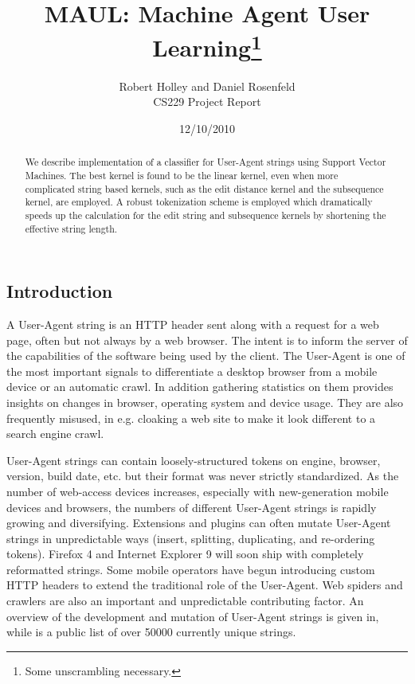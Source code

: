 \documentclass[10pt]{article}
\title{MAUL: Machine Agent User Learning\footnote{Some unscrambling necessary.} }
\author{Robert Holley and Daniel Rosenfeld \\ CS229 Project Report}
\date{12/10/2010}
\begin{document}
\maketitle
\begin{abstract}
We describe implementation of a classifier for User-Agent strings using Support Vector Machines.  The best kernel is found to be the linear kernel, even when more complicated string based kernels, such as the edit distance kernel and the subsequence kernel, are employed.  A robust tokenization scheme is employed which dramatically speeds up the calculation for the edit string and subsequence kernels by shortening the effective string length. 
\end{abstract}
\begin{multicols}{2}

\section{Introduction}
A User-Agent string is an HTTP header sent along with a request for a web page, often but not always by a web browser.\cite{httprfc} The intent is to inform the server
of the capabilities of the software being used by the client. The User-Agent is
one of the most important signals to differentiate a desktop browser from a
mobile device or an automatic crawl. In addition gathering statistics on them
provides insights on changes in browser, operating system and device usage. They
are also frequently misused, in e.g. cloaking a web site to make it look
different to a search engine crawl.

User-Agent strings can contain loosely-structured tokens on engine, browser,
version, build date, etc. but their format was never strictly standardized.\cite{httprfc}
As the number of web-access devices increases, especially with new-generation
mobile devices and browsers, the numbers of different User-Agent strings is
rapidly growing and diversifying. Extensions and plugins can often mutate
User-Agent strings in unpredictable ways (insert, splitting, duplicating, and
re-ordering tokens). Firefox 4 and Internet Explorer 9 will soon ship with
completely reformatted strings. Some mobile operators have begun introducing
custom HTTP headers to extend the traditional role of the User-Agent.\cite{mobile} Web spiders and crawlers are also an important and unpredictable contributing factor.
An overview of the development and mutation of User-Agent strings is given in,\cite{history} while \cite{uatracker} is a public list of over 50000 currently unique strings.


\end{multicols}
\end{document}
